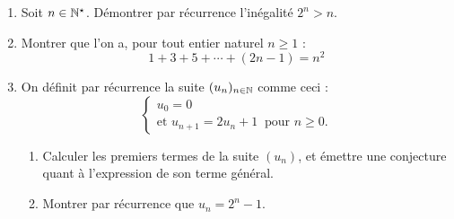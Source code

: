 \documentclass[11pt,class=report,crop=false]{standalone}
\begin{document}
\exercice{}
\sauteligne
\begin{enumerate}
    \item Soit $n \in \mathbb{N}^\star$. Démontrer par récurrence l'inégalité $2^n > n$.
    
    \item Montrer que l'on a, pour tout entier naturel $n \ge 1$ :
    $$ 1 + 3 + 5 + \cdots + (2n-1) = n^2 $$
    
    \item On définit par récurrence la suite $(u_n)_{n \in \mathbb{N}}$ comme ceci :
    $$\left\{\begin{array}{l}
    u_0 = 0  \\
    \text{et } u_{n+1} = 2 u_n + 1 \  \text{ pour } n \ge 0.
    \end{array}\right.
    $$
    \begin{enumerate}
        \item Calculer les premiers termes de la suite $(u_n)$, et émettre une conjecture quant à l'expression de son terme général.
        \item Montrer par récurrence que $u_n = 2^n - 1$.
    \end{enumerate}
\end{enumerate}
\finenonce

\finexercice
\end{document}
